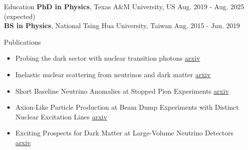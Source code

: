 \documentclass{resume}
\begin{document}
\vspace{-1.5em}
\begin{rSection}{Education}
\vspace{-0.25em}
{\bf PhD in Physics}, Texas A\&M University, US \hfill {Aug. 2019 - Aug. 2025 (expected)} \\
{\bf BS in Physics}, National Tsing Hua University, Taiwan \hfill {Aug. 2015 - Jun. 2019}
\end{rSection}


\vspace{-0.5em}
\begin{rSection}{Publications}
    \begin{itemize}
        \item Probing the dark sector with nuclear transition photons \hfill \href{https://arxiv.org/pdf/2302.10250.pdf}{arxiv}
        \item Inelastic nuclear scattering from neutrinos and dark matter \hfill \href{https://arxiv.org/pdf/2206.08590.pdf}{arxiv}
        \item Short Baseline Neutrino Anomalies at Stopped Pion Experiments \hfill \href{https://arxiv.org/abs/2310.13194}{arxiv}
        \item Axion-Like Particle Production at Beam Dump Experiments with Distinct Nuclear Excitation Lines \hfill \href{https://arxiv.org/pdf/2207.13659.pdf}{arxiv}
        \item Exciting Prospects for Dark Matter at Large-Volume Neutrino Detectors \hfill \href{https://arxiv.org/abs/2402.04184}{arxiv}
    \end{itemize}
\end{rSection}
\end{document}

